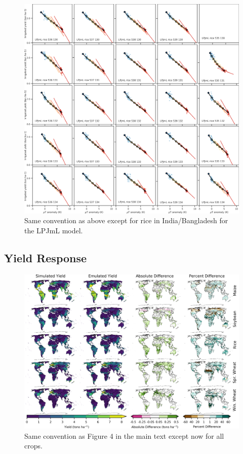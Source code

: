 \documentclass[10pt]{article}
\begin{document}
\begin{figure}[h!]
\centering
\includegraphics[width=\textwidth]{tempyearvclim_rice_LPJmL.png}
\caption{Same convention as above except for rice in India/Bangladesh for the LPJmL model.}
\label{fig:lpjmlrice}
\end{figure}

\clearpage
\subsection{Yield Response}
\begin{figure}[h!]
\includegraphics[width=\textwidth]{lpjml_grid.png}
\caption{Same convention as Figure 4 in the main text except now for all crops.}
\label{fig:lpjmlrice}
\end{figure}
\end{document}
